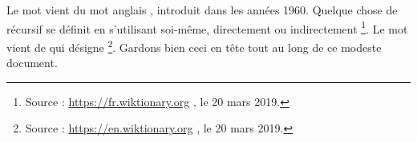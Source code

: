 Le mot  vient du mot anglais , introduit dans les années 1960. Quelque chose de récursif se définit en s'utilisant soi-même, directement ou indirectement
\footnote{
	Source : \url{https://fr.wiktionary.org} , le 20 mars 2019.
}.
Le mot vient de  qui désigne 
\footnote{
	Source : \url{https://en.wiktionary.org} , le 20 mars 2019.
}.
Gardons bien ceci en tête tout au long de ce modeste document.